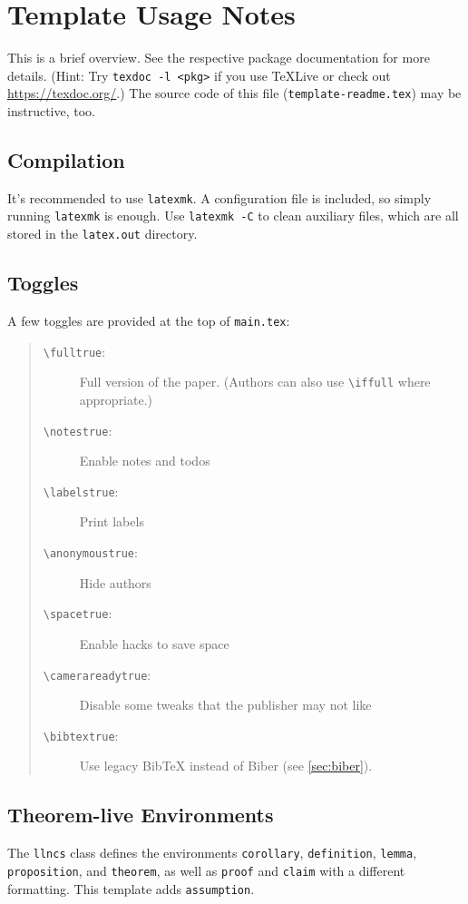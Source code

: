 \setcounter{section}{-1}
\section{Template Usage Notes}
This is a brief overview.
See the respective package documentation for more details. (Hint: Try \texttt{texdoc -l <pkg>} if you use TeXLive or check out \url{https://texdoc.org/}.)
The source code of this file (\texttt{template-readme.tex}) may be instructive, too.


\subsection{Compilation}
It's recommended to use \texttt{latexmk}.
A configuration file is included, so simply running \texttt{latexmk} is enough.
Use \texttt{latexmk -C} to clean auxiliary files, which are all stored in the \texttt{latex.out} directory.


\subsection{Toggles}
A few toggles are provided at the top of \texttt{main.tex}:
\begin{quote}
  \begin{description}
    \item [\texttt{\textbackslash{}fulltrue}:]
          Full version of the paper. (Authors can also use \verb|\iffull| where appropriate.)
    \item [\texttt{\textbackslash{}notestrue}:]
          Enable notes and todos
    \item [\texttt{\textbackslash{}labelstrue}:]
          Print labels
    \item [\texttt{\textbackslash{}anonymoustrue}:]
          Hide authors
    \item [\texttt{\textbackslash{}spacetrue}:]
          Enable hacks to save space
    \item [\texttt{\textbackslash{}camerareadytrue}:]
          Disable some tweaks that the publisher may not like
    \item [\texttt{\textbackslash{}bibtextrue}:]
          Use legacy BibTeX instead of Biber (see \cref{sec:biber}).
  \end{description}
\end{quote}


\subsection{Theorem-live Environments}
The \texttt{llncs} class defines the environments
\texttt{corollary}, \texttt{definition}, \texttt{lemma}, \texttt{proposition}, and \texttt{theorem},
as well as \texttt{proof} and \texttt{claim} with a different formatting.
This template adds \texttt{assumption}.

